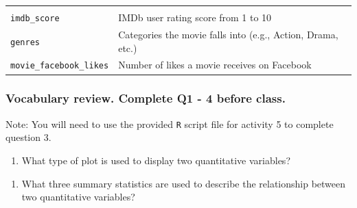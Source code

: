 \documentclass[
]{report}
\providecommand{\tightlist}{%
  \setlength{\itemsep}{0pt}\setlength{\parskip}{0pt}}
\begin{document}
\begin{longtable}[]{@{}ll@{}}
\begin{minipage}[t]{0.72\columnwidth}
\end{minipage}\tabularnewline
\begin{minipage}[t]{0.22\columnwidth}\raggedright
\texttt{imdb\_score}\strut
\end{minipage} & \begin{minipage}[t]{0.72\columnwidth}\raggedright
IMDb user rating score from 1 to 10\strut
\end{minipage}\tabularnewline
\begin{minipage}[t]{0.22\columnwidth}\raggedright
\texttt{genres}\strut
\end{minipage} & \begin{minipage}[t]{0.72\columnwidth}\raggedright
Categories the movie falls into (e.g., Action, Drama, etc.)\strut
\end{minipage}\tabularnewline
\begin{minipage}[t]{0.22\columnwidth}\raggedright
\texttt{movie\_facebook\_likes}\strut
\end{minipage} & \begin{minipage}[t]{0.72\columnwidth}\raggedright
Number of likes a movie receives on Facebook\strut
\end{minipage}\tabularnewline
\bottomrule
\end{longtable}

\hypertarget{vocabulary-review.-complete-q1---4-before-class.}{%
\subsubsection*{Vocabulary review. Complete Q1 - 4 before class.}\label{vocabulary-review.-complete-q1---4-before-class.}}

Note: You will need to use the provided \texttt{R} script file for activity 5 to complete question 3.

\begin{enumerate}
\def\labelenumi{\arabic{enumi}.}
\tightlist
\item
  What type of plot is used to display two quantitative variables?
\end{enumerate}

\vspace{0.2in}

\begin{enumerate}
\def\labelenumi{\arabic{enumi}.}
\setcounter{enumi}{1}
\tightlist
\item
  What three summary statistics are used to describe the relationship between two quantitative variables?
\end{enumerate}
\end{document}
